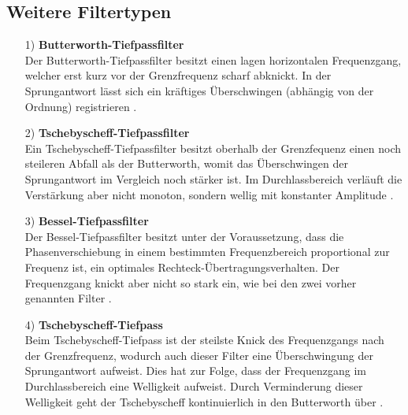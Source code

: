 \subsection*{Weitere Filtertypen}
\begin{itemize}
    \item[1)]\textbf{Butterworth-Tiefpassfilter}\\
    Der Butterworth-Tiefpassfilter besitzt einen lagen horizontalen Frequenzgang, welcher erst kurz vor der Grenzfrequenz scharf abknickt. In der Sprungantwort lässt sich ein kräftiges Überschwingen (abhängig von der Ordnung) registrieren \citep{VA}.
    \item[2)]\textbf{Tschebyscheff-Tiefpassfilter}\\
    Ein Tschebyscheff-Tiefpassfilter besitzt oberhalb der Grenzfequenz einen noch steileren Abfall als der Butterworth, womit das Überschwingen der Sprungantwort im Vergleich noch stärker ist. Im Durchlassbereich verläuft die Verstärkung aber nicht monoton, sondern wellig mit konstanter Amplitude \citep{VA}.
    \item[3)]\textbf{Bessel-Tiefpassfilter}\\
    Der Bessel-Tiefpassfilter besitzt unter der Voraussetzung, dass die Phasenverschiebung in einem bestimmten Frequenzbereich proportional zur Frequenz ist, ein optimales Rechteck-Übertragungsverhalten. Der Frequenzgang knickt aber nicht so stark ein, wie bei den zwei vorher genannten Filter \citep{VA}.
    \item[4)]\textbf{Tschebyscheff-Tiefpass}\\
    Beim Tschebyscheff-Tiefpass ist der steilste Knick des Frequenzgangs nach der Grenzfrequenz, wodurch auch dieser Filter eine Überschwingung der Sprungantwort aufweist. Dies hat zur Folge, dass der Frequenzgang im Durchlassbereich eine Welligkeit aufweist. Durch Verminderung dieser Welligkeit geht der Tschebyscheff kontinuierlich in den Butterworth über \citep{VA}. 
\end{itemize}

